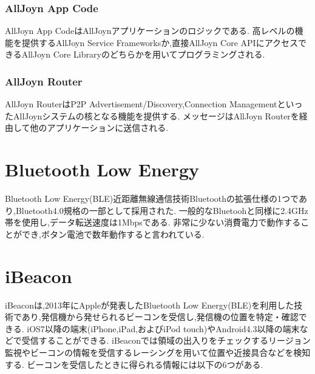 \subsubsection{AllJoyn App Code}
AllJoyn App CodeはAllJoynアプリケーションのロジックである.
高レベルの機能を提供するAllJoyn Service Frameworksか,直接AllJoyn Core APIにアクセスできるAllJoyn Core Libraryのどちらかを用いてプログラミングされる.

\subsubsection{AllJoyn Router}
AllJoyn RouterはP2P Advertisement/Discovery,Connection ManagementといったAllJoynシステムの核となる機能を提供する.
メッセージはAllJoyn Routerを経由して他のアプリケーションに送信される.



\section{Bluetooth Low Energy}
Bluetooth Low Energy(BLE)\cite{BLE1}\cite{BLE2}近距離無線通信技術Bluetoothの拡張仕様の1つであり,Bluetooth4.0規格の一部として採用された.
一般的なBluetoohと同様に2.4GHz帯を使用し,データ転送速度は1Mbpsである.
非常に少ない消費電力で動作することができ,ボタン電池で数年動作すると言われている.

\section{iBeacon}
iBeacon\cite{iBeacon}\cite{iBeaconを使用してみよう}は,2013年にAppleが発表したBluetooth Low Energy(BLE)を利用した技術であり,発信機から発せられるビーコンを受信し,発信機の位置を特定・確認できる.
iOS7以降の端末(iPhone,iPad,およびiPod touch)やAndroid4.3以降の端末などで受信することができる.
iBeaconでは領域の出入りをチェックするリージョン監視やビーコンの情報を受信するレーシングを用いて位置や近接具合などを検知する.
ビーコンを受信したときに得られる情報には以下の6つがある.


